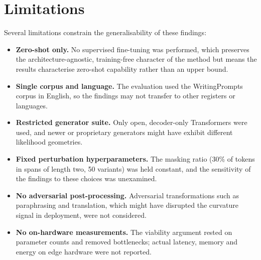 \documentclass[logo,msc,cs]{infthesis}      %
\begin{document}
\section{Limitations}
\label{sec:limitations}
Several limitations constrain the generalisability of these findings:
\begin{itemize}
\item \textbf{Zero-shot only.} No supervised fine-tuning was performed, which preserves the architecture-agnostic, training-free character of the method but means the results characterise zero-shot capability rather than an upper bound.
\item \textbf{Single corpus and language.} The evaluation used the WritingPrompts corpus in English, so the findings may not transfer to other registers or languages.
\item \textbf{Restricted generator suite.} Only open, decoder-only Transformers were used, and newer or proprietary generators might have exhibit different likelihood geometries.
\item \textbf{Fixed perturbation hyperparameters.} The masking ratio (30\% of tokens in spans of length two, 50 variants) was held constant, and the sensitivity of the findings to these choices was unexamined.
\item \textbf{No adversarial post-processing.} Adversarial transformations such as paraphrasing and translation, which might have disrupted the curvature signal in deployment, were not considered.
\item \textbf{No on-hardware measurements.} The viability argument rested on parameter counts and removed bottlenecks; actual latency, memory and energy on edge hardware were not reported.
\end{itemize}
\end{document}
